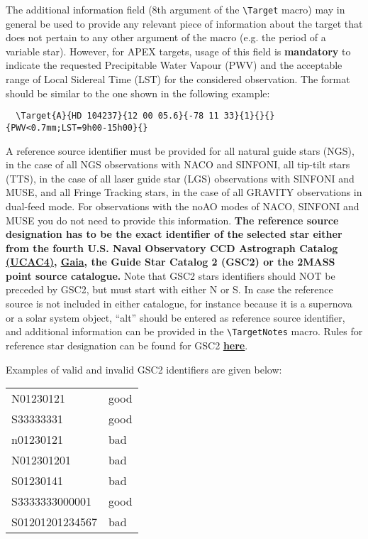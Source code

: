 \documentclass{article}
\begin{document}
The additional information field (8th argument of the \verb|\Target|
macro) may in general be used to provide any relevant piece of
information about the target that does not pertain to any other
argument of the macro (e.g. the period of a variable star). However,
for APEX targets, usage of this field is {\bf mandatory} to indicate the
requested Precipitable Water Vapour (PWV) and the acceptable range of
Local Sidereal Time (LST) for the considered observation. The format
should be similar to the one shown in the following example:
\begin{verbatim}
  \Target{A}{HD 104237}{12 00 05.6}{-78 11 33}{1}{}{}{PWV<0.7mm;LST=9h00-15h00}{}
\end{verbatim}


A reference source identifier must be provided for all natural guide 
stars (NGS), in the case of all NGS observations with NACO and SINFONI, 
all tip-tilt stars (TTS), in the case of all laser guide star (LGS)
observations with SINFONI and MUSE, and all Fringe Tracking stars, in the case
of all GRAVITY observations in dual-feed mode.
For observations with the noAO modes of NACO, SINFONI and MUSE 
you do not need to provide this information. {\bf The reference source
designation has to be the exact identifier of the selected star
either from the fourth U.S. Naval Observatory CCD Astrograph Catalog \href{http://cdsarc.u-strasbg.fr/viz-bin/Cat?I/322A}{\underline {(UCAC4)}}, \href{http://vizier.u-strasbg.fr/viz-bin/VizieR-3}{\underline {Gaia}}, the Guide Star Catalog 2 (GSC2) or the 2MASS point source catalogue.} Note that GSC2 stars identifiers should NOT be preceded
by GSC2, but must start with either N or S. In case the reference source is not
included in either catalogue, for instance because it is a supernova or
a solar system object, ``alt'' should be entered as reference source
identifier, and additional information can be provided in the
\verb|\TargetNotes| macro.
Rules for reference star designation can be found for GSC2 
\href{http://vizier.u-strasbg.fr/viz-bin/VizieR-n?-source=METAnot&catid=1271&notid=1&-out=text}{\bf\underline{here}}. 

\smallskip

Examples of valid and invalid GSC2 identifiers are given below:

\begin{center}
\begin{tabular}{ll}
    N01230121           & good\\
    S33333331           & good\\
    n01230121           & bad\\
    N012301201          & bad\\
    S01230141           & bad\\
    S3333333000001      & good\\
    S01201201234567     & bad\\
\end{tabular}
\end{center}
\end{document}
